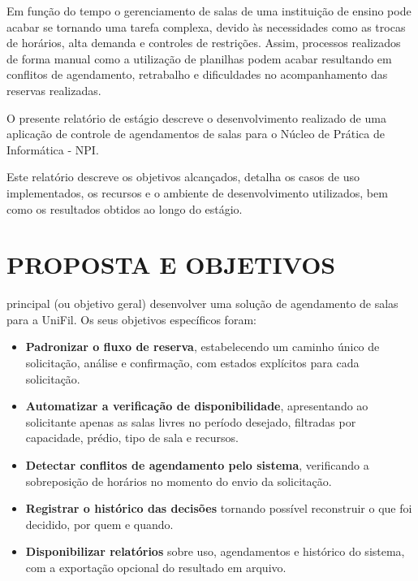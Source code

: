 Em função do tempo o gerenciamento de salas de uma instituição de ensino pode acabar se tornando uma tarefa complexa, devido às necessidades como as trocas de horários, alta demanda e controles de restrições. Assim, processos realizados de forma manual como a utilização de planilhas podem acabar resultando em conflitos de agendamento, retrabalho e dificuldades no acompanhamento das reservas realizadas.

O presente relatório de estágio descreve o desenvolvimento realizado de uma aplicação de controle de agendamentos de salas para o Núcleo de Prática de Informática - NPI.

Este relatório descreve os objetivos alcançados, detalha os casos de uso implementados, os recursos e o ambiente de desenvolvimento utilizados, bem como os resultados obtidos ao longo do estágio.

\section{PROPOSTA E OBJETIVOS}


principal (ou objetivo geral) desenvolver uma solução de agendamento de salas para a UniFil. Os seus objetivos específicos foram:

\begin{itemize}

    \item \textbf{Padronizar o fluxo de reserva}, estabelecendo um caminho único de
          solicitação, análise e confirmação, com estados explícitos para cada
          solicitação.

    \item \textbf{Automatizar a verificação de disponibilidade}, apresentando ao
          solicitante apenas as salas livres no período desejado, filtradas por
          capacidade, prédio, tipo de sala e recursos.

    \item \textbf{Detectar conflitos de agendamento pelo sistema}, verificando a
          sobreposição de horários no momento do envio da solicitação.

    \item \textbf{Registrar o histórico das decisões} tornando possível reconstruir o que
          foi decidido, por quem e quando.

    \item \textbf{Disponibilizar relatórios} sobre uso, agendamentos e
          histórico do sistema, com a exportação opcional do resultado em arquivo.
\end{itemize}

